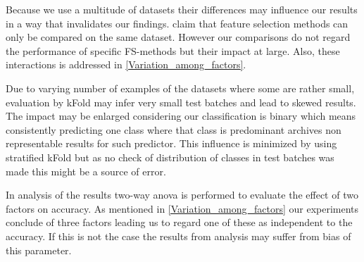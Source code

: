 Because we use a multitude of datasets their differences may influence our results in a way that invalidates our findings. \textcite{c201416} claim that feature selection methods can only be compared on the same dataset. However our comparisons do not regard the performance of specific FS-methods but their impact at large. Also, these interactions is addressed in \ref{Variation_among_factors}.

Due to varying number of examples of the datasets where some are rather small, evaluation by kFold may infer very small test batches and lead to skewed results. The impact may be enlarged considering our classification is binary which means consistently predicting one class where that class is predominant archives non representable results for such predictor. This influence is minimized by using stratified kFold but as no check of distribution of classes in test batches was made this might be a source of error.

In analysis of the results two-way anova is performed to evaluate the effect of two factors on accuracy. As mentioned in \ref{Variation_among_factors} our experiments conclude of three factors leading us to regard one of these as independent to the accuracy. If this is not the case the results from analysis may suffer from bias of this parameter.
